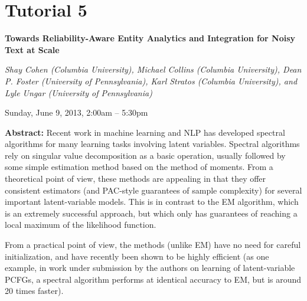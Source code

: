 \begin{bio}
\noindent

\end{bio}

\section%
    [\textbf{T5:}  Spectral Learning Algorithms for Natural Language Processing (S. Cohen, M. Collins, D.~P. Foster, K. Stratos and L. Ungar)]
    {Tutorial 5}
\label{TutE}
\begin{center}
\begin{Large}
\bfseries Towards Reliability-Aware Entity Analytics and Integration for Noisy Text at Scale\\ \vspace{2em}\par
\end{Large}

{\itshape Shay Cohen (Columbia University), Michael Collins (Columbia University), Dean P. Foster (University of Pennsylvania), Karl Stratos (Columbia University), and Lyle Ungar (University of Pennsylvania)}\vspace{1em}\par
Sunday, June 9, 2013, 2:00am -- 5:30pm \vspace{1em}\\
\TutLocE
\end{center}

\noindent
{\bfseries Abstract:} Recent work in machine learning and NLP has developed spectral algorithms for many learning tasks involving latent variables. Spectral algorithms rely on singular value decomposition as a basic operation, usually followed by some simple estimation method based on the method of moments. From a theoretical point of view, these methods are appealing in that they offer consistent estimators (and PAC-style guarantees of sample complexity) for several important latent-variable models. This is in contrast to the EM algorithm, which is an extremely successful approach, but which only has guarantees of reaching a local maximum of the likelihood function.

From a practical point of view, the methods (unlike EM) have no need for careful initialization, and have recently been shown to be highly efficient (as one example, in work under submission by the authors on learning of latent-variable PCFGs, a spectral algorithm performs at identical accuracy to EM, but is around 20 times faster).

